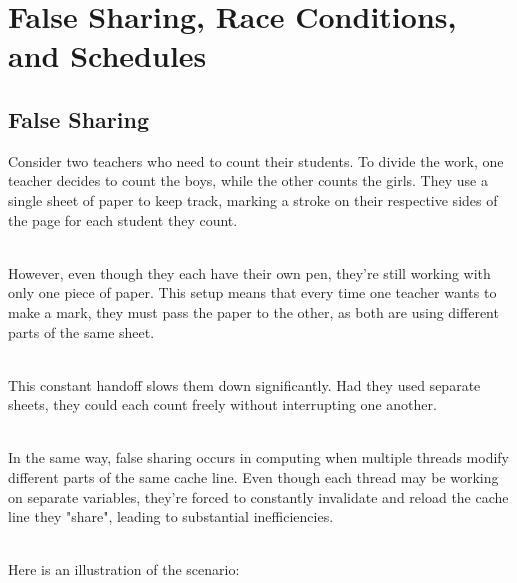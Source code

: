 \documentclass[../../main.tex]{subfiles}
\begin{document}
    \section{False Sharing, Race Conditions, and Schedules}
    \subsection{False Sharing}
    Consider two teachers who need to count their students. To divide the work, one teacher decides to count the boys, while the other counts the girls. They use a single sheet of paper to keep track, marking a stroke on their respective sides of the page for each student they count.
    
    ~\\
    However, even though they each have their own pen, they're still working with only one piece of paper. This setup means that every time one teacher wants to make a mark, they must pass the paper to the other, as both are using different parts of the same sheet.

    ~\\
    This constant handoff slows them down significantly. Had they used separate sheets, they could each count freely without interrupting one another.

    ~\\
    In the same way, false sharing occurs in computing when multiple threads modify different parts of the same cache line. Even though each thread may be working on separate variables, they're forced to constantly invalidate and reload the cache line they "share", leading to substantial inefficiencies.

    ~\\
    Here is an illustration of the scenario:
\end{document}
